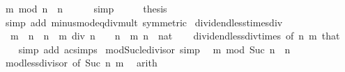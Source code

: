\begin{isabellebody}
\ {\isachardoublequoteopen}m\ mod\ n\ {\isacharless}{\kern0pt}\ n{\isachardoublequoteclose}\isanewline
\ \ \ \ \isamarkupfalse%
\ simp\isanewline
\ \ \isamarkupfalse%
\ \isamarkupfalse%
\ {\isacharquery}{\kern0pt}thesis\isanewline
\ \ \ \ \isamarkupfalse%
\ {\isacharparenleft}{\kern0pt}simp\ add{\isacharcolon}{\kern0pt}\ minus{\isacharunderscore}{\kern0pt}mod{\isacharunderscore}{\kern0pt}eq{\isacharunderscore}{\kern0pt}div{\isacharunderscore}{\kern0pt}mult\ {\isacharbrackleft}{\kern0pt}symmetric{\isacharbrackright}{\kern0pt}{\isacharparenright}{\kern0pt}\isanewline
{}\isamarkupfalse%
%
\endisatagproof
{\isafoldproof}%
%
\isadelimproof
\isanewline
%
\endisadelimproof
\isanewline
{}\isamarkupfalse%
\ dividend{\isacharunderscore}{\kern0pt}less{\isacharunderscore}{\kern0pt}times{\isacharunderscore}{\kern0pt}div{\isacharcolon}{\kern0pt}\isanewline
\ \ {\isachardoublequoteopen}m\ {\isacharless}{\kern0pt}\ n\ {\isacharplus}{\kern0pt}\ n\ {\isacharasterisk}{\kern0pt}\ {\isacharparenleft}{\kern0pt}m\ div\ n{\isacharparenright}{\kern0pt}{\isachardoublequoteclose}\ \ {\isachardoublequoteopen}{}\ {\isacharless}{\kern0pt}\ n{\isachardoublequoteclose}\ \ m\ n\ {\isacharcolon}{\kern0pt}{\isacharcolon}{\kern0pt}\ nat\isanewline
%
\isadelimproof
\ \ %
\endisadelimproof
%
\isatagproof
{}\isamarkupfalse%
\ dividend{\isacharunderscore}{\kern0pt}less{\isacharunderscore}{\kern0pt}div{\isacharunderscore}{\kern0pt}times\ {\isacharbrackleft}{\kern0pt}of\ n\ m{\isacharbrackright}{\kern0pt}\ that\isanewline
\ \ \isamarkupfalse%
\ {\isacharparenleft}{\kern0pt}simp\ add{\isacharcolon}{\kern0pt}\ ac{\isacharunderscore}{\kern0pt}simps{\isacharparenright}{\kern0pt}%
\endisatagproof
{\isafoldproof}%
%
\isadelimproof
\isanewline
%
\endisadelimproof
\isanewline
{}\isamarkupfalse%
\ mod{\isacharunderscore}{\kern0pt}Suc{\isacharunderscore}{\kern0pt}le{\isacharunderscore}{\kern0pt}divisor\ {\isacharbrackleft}{\kern0pt}simp{\isacharbrackright}{\kern0pt}{\isacharcolon}{\kern0pt}\isanewline
\ \ {\isachardoublequoteopen}m\ mod\ Suc\ n\ {\isasymle}\ n{\isachardoublequoteclose}\isanewline
%
\isadelimproof
\ \ %
\endisadelimproof
%
\isatagproof
{}\isamarkupfalse%
\ mod{\isacharunderscore}{\kern0pt}less{\isacharunderscore}{\kern0pt}divisor\ {\isacharbrackleft}{\kern0pt}of\ {\isachardoublequoteopen}Suc\ n{\isachardoublequoteclose}\ m{\isacharbrackright}{\kern0pt}\ \isamarkupfalse%
\ arith%

\end{isabellebody}
